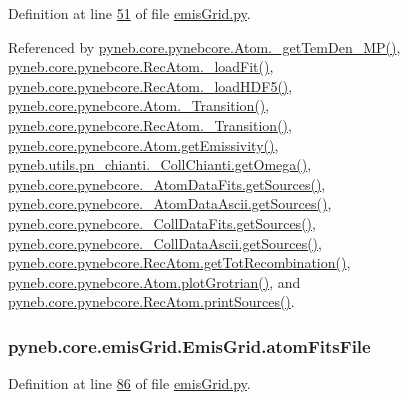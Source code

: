 Definition at line \hyperlink{emis_grid_8py_source_l00051}{51} of file \hyperlink{emis_grid_8py_source}{emis\-Grid.\-py}.



Referenced by \hyperlink{pynebcore_8py_source_l02046}{pyneb.\-core.\-pynebcore.\-Atom.\-\_\-get\-Tem\-Den\-\_\-\-M\-P()}, \hyperlink{pynebcore_8py_source_l02754}{pyneb.\-core.\-pynebcore.\-Rec\-Atom.\-\_\-load\-Fit()}, \hyperlink{pynebcore_8py_source_l02714}{pyneb.\-core.\-pynebcore.\-Rec\-Atom.\-\_\-load\-H\-D\-F5()}, \hyperlink{pynebcore_8py_source_l01433}{pyneb.\-core.\-pynebcore.\-Atom.\-\_\-\-Transition()}, \hyperlink{pynebcore_8py_source_l02812}{pyneb.\-core.\-pynebcore.\-Rec\-Atom.\-\_\-\-Transition()}, \hyperlink{pynebcore_8py_source_l01782}{pyneb.\-core.\-pynebcore.\-Atom.\-get\-Emissivity()}, \hyperlink{pn__chianti_8py_source_l00507}{pyneb.\-utils.\-pn\-\_\-chianti.\-\_\-\-Coll\-Chianti.\-get\-Omega()}, \hyperlink{pynebcore_8py_source_l00190}{pyneb.\-core.\-pynebcore.\-\_\-\-Atom\-Data\-Fits.\-get\-Sources()}, \hyperlink{pynebcore_8py_source_l00460}{pyneb.\-core.\-pynebcore.\-\_\-\-Atom\-Data\-Ascii.\-get\-Sources()}, \hyperlink{pynebcore_8py_source_l00690}{pyneb.\-core.\-pynebcore.\-\_\-\-Coll\-Data\-Fits.\-get\-Sources()}, \hyperlink{pynebcore_8py_source_l01022}{pyneb.\-core.\-pynebcore.\-\_\-\-Coll\-Data\-Ascii.\-get\-Sources()}, \hyperlink{pynebcore_8py_source_l02851}{pyneb.\-core.\-pynebcore.\-Rec\-Atom.\-get\-Tot\-Recombination()}, \hyperlink{pynebcore_8py_source_l02443}{pyneb.\-core.\-pynebcore.\-Atom.\-plot\-Grotrian()}, and \hyperlink{pynebcore_8py_source_l02912}{pyneb.\-core.\-pynebcore.\-Rec\-Atom.\-print\-Sources()}.

\hypertarget{classpyneb_1_1core_1_1emis_grid_1_1_emis_grid_a5abe442aad7ee62b912ad97ec4d71d6c}{
\subsubsection[{atom\-Fits\-File}]{\setlength{\rightskip}{0pt plus 5cm}pyneb.\-core.\-emis\-Grid.\-Emis\-Grid.\-atom\-Fits\-File}}\label{classpyneb_1_1core_1_1emis_grid_1_1_emis_grid_a5abe442aad7ee62b912ad97ec4d71d6c}


Definition at line \hyperlink{emis_grid_8py_source_l00086}{86} of file \hyperlink{emis_grid_8py_source}{emis\-Grid.\-py}.



